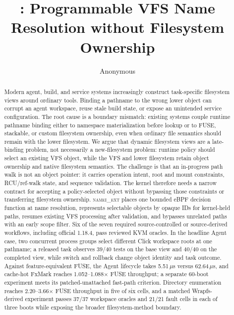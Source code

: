 \documentclass[10pt]{article}
\title{\namei: Programmable VFS Name Resolution without Filesystem Ownership}
\author{Anonymous}
\date{}
\newcommand{\namei}{\textsc{namei\_ext}\xspace}
\newcommand{\code}[1]{\texttt{\detokenize{#1}}}
\begin{document}
\maketitle

\begin{abstract}
Modern agent, build, and service systems increasingly construct task-specific
filesystem views around ordinary tools. Binding a pathname to the wrong lower
object can corrupt an agent workspace, reuse stale build state, or expose an
unintended service configuration. The root cause is a boundary mismatch:
existing systems couple runtime pathname binding either to namespace
materialization before lookup or to FUSE, stackable, or custom filesystem
ownership, even when ordinary file semantics should remain with the lower
filesystem. We argue that dynamic filesystem views are a late-binding problem,
not necessarily a new-filesystem problem: runtime policy should select an
existing VFS object, while the VFS and lower filesystem retain object ownership
and native filesystem semantics. The challenge is that an
in-progress path walk is not an object pointer: it carries operation intent,
root and mount constraints, RCU/ref-walk state, and sequence validation. The
kernel therefore needs a narrow contract for accepting a policy-selected object
without bypassing those constraints or transferring filesystem ownership.
\namei
places one bounded eBPF decision function at name resolution, represents
selectable objects by opaque IDs for kernel-held paths, resumes existing VFS
processing after validation, and bypasses unrelated paths with an early scope
filter. Six of the seven required
source-controlled or source-derived workflows, including official
\code{xdg-document-portal} 1.18.4, pass reviewed KVM oracles. In
the headline Agent case,
two concurrent process groups select different Click workspace roots
at one pathname; a released task observes 39/40 tests on the base view and
40/40 on the completed view, while switch and rollback change object identity
and task outcome. Against feature-equivalent FUSE, the Agent lifecycle takes
5.51\,\(\mu\)s versus 62.64\,\(\mu\)s, and cache-hot FxMark
\code{SELECT} reaches 1.052--1.088\(\times\) FUSE throughput; a separate
60-boot experiment meets its patched-unattached fast-path criterion. Directory
enumeration reaches 2.20--3.66\(\times\) FUSE throughput in five of six cells,
and a matched Wrapfs-derived experiment passes 37/37 workspace oracles and
21/21 fault cells in each of three boots while exposing the broader
filesystem-method boundary.
\end{abstract}











{\small


}
\end{document}
